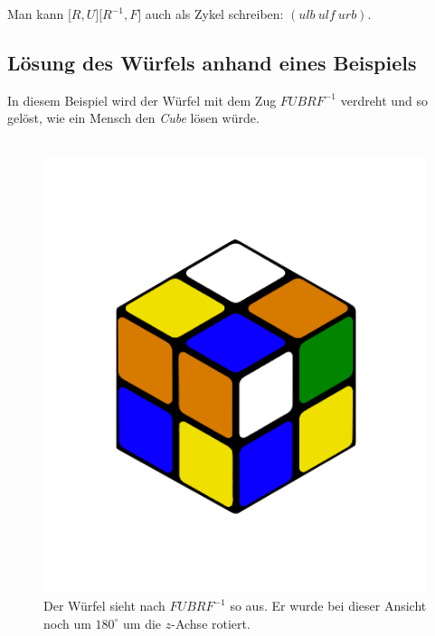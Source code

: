 \documentclass[12pt,a4paper, usenames, dvipsnames]{article}
\begin{document}
Man kann $\lbrack R, U \rbrack \lbrack R^{-1}, F \rbrack$ auch als Zykel schreiben: $(ulb \ ulf \ urb)$. \\




















\subsection*{Lösung des Würfels anhand eines Beispiels}

In diesem Beispiel wird der Würfel mit dem Zug $FUBRF^{-1}$ verdreht und so gelöst, wie ein Mensch den \textit{Cube} lösen würde. \\
\\
\begin{figure}[H]
\centering
\includegraphics[scale=0.12]{LURFL1.png}
\caption[Cube nach Zug $FUBRF^{-1}$]{Der Würfel sieht nach $FUBRF^{-1}$ so aus. Er wurde bei dieser Ansicht noch um $180^\circ$ um die $z$-Achse rotiert.}
\end{figure}
\end{document}
